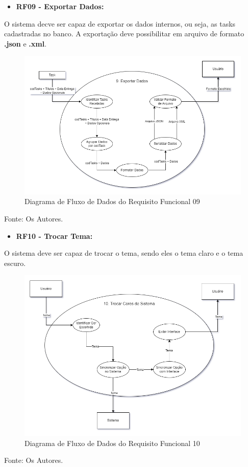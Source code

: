 \documentclass[a4paper,12pt]{article}
\begin{document}
\pagebreak
\begin{itemize}
\item\textbf{RF09 - Exportar Dados:}
\end{itemize}

O sistema decve ser capaz de exportar os dados internos, ou seja, as tasks cadastradas no banco. A exportação deve possibilitar 
em arquivo de formato \textbf{.json} e \textbf{.xml}.
\begin{figure}[H]
	\centering
	\includegraphics[scale=0.45]{DFDs/RF09.drawio.png}
	\caption{Diagrama de Fluxo de Dados do Requisito Funcional 09}
\end{figure}
\noindent Fonte: Os Autores.

\pagebreak
\begin{itemize}
\item\textbf{RF10 - Trocar Tema:}
\end{itemize}

O sistema deve ser capaz de trocar o tema, sendo eles o tema claro e o tema escuro.
\begin{figure}[H]
	\centering
	\includegraphics[scale=0.45]{DFDs/RF10.drawio.png}
	\caption{Diagrama de Fluxo de Dados do Requisito Funcional 10}
\end{figure}
\noindent Fonte: Os Autores.
\end{document}
